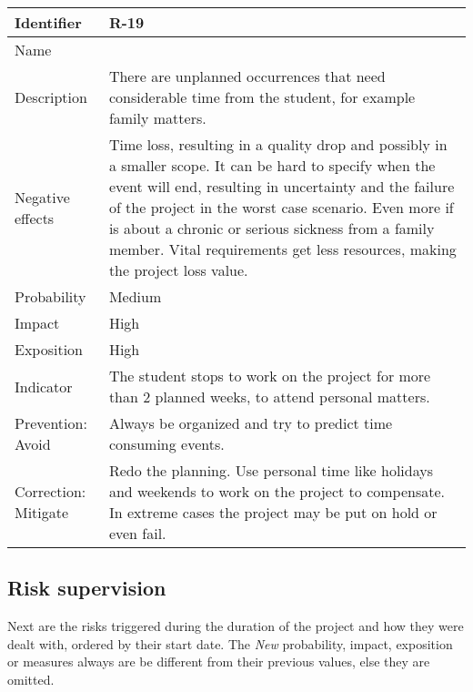 \begin{table}[H]
	\begin{tabularx}{\textwidth}{|y|z|}
		\hline
		Identifier & \textbf{R-19} \\ \hline
		Name & \Rdiecinueve \\ \hline
		Description &
			There are unplanned occurrences that need considerable time from the student, for example family matters.
		\\ \hline
		Negative effects &
			Time loss, resulting in a quality drop and possibly in a smaller scope.\linej
			It can be hard to specify when the event will end, resulting in uncertainty and the failure of the project in the worst case scenario. Even more if is about a chronic or serious sickness from a family member. \linej
			Vital requirements get less resources, making the project loss value.
		\\ \hline
		Probability & Medium\\ \hline
		Impact & High\\ \hline
		Exposition & High\\ \hline
		Indicator & The student stops to work on the project for more than 2 planned weeks, to attend personal matters.\\ \hline
		Prevention: Avoid &
			Always be organized and try to predict time consuming events.
		\\ \hline
		Correction: Mitigate &
			Redo the planning. \linej
			Use personal time like holidays and weekends to work on the project to compensate.
			In extreme cases the project may be put on hold or even fail.
		\\ \hline
	\end{tabularx}
\end{table}

\subsection{Risk supervision}
Next are the risks triggered during the duration of the project and how they were dealt with, ordered by their start date.
The \textit{New} probability, impact, exposition or measures always are be different from their previous values, else they are omitted.

